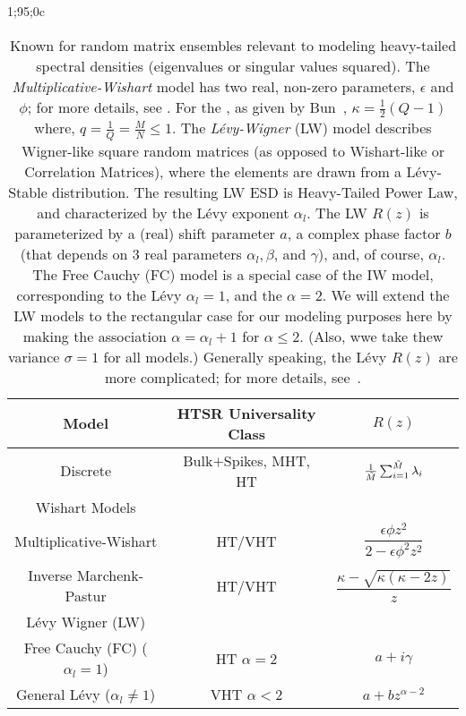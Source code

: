 1;95;0c%
\begin{table}[h!]
  \centering
  \renewcommand{\arraystretch}{1.25} %
\begin{tabular}{|c|c|c|}
  \hline
  Model & \textbf{HTSR Universality Class} & \textbf{$R(z)$}\\  \hline
  \hline
  Discrete & Bulk$+$Spikes, MHT, HT & $\tfrac{1}{\tilde{M}}\sum_{i=1}^{\tilde{M}}\lambda_{i}$   \\ \hline
  \hline
  Wishart Models & &\\ \hline
  Multiplicative-Wishart & HT/VHT& $\dfrac{\epsilon\phi z^2}{2 - \epsilon\phi^2 z^2}$ \\  \hline
  Inverse Marchenk-Pastur & HT/VHT &  $\dfrac{\kappa-\sqrt{\kappa(\kappa-2z)}}{z}$   \\  \hline
  \hline
  L\'evy Wigner (LW) &   & \\  \hline
  Free Cauchy (FC) ($\alpha_{l}=1$) & HT $\alpha=2$ & $a+i\gamma$ \\ \hline
  General L\'evy  ($\alpha_{l}\ne 1$) & VHT $\alpha<2$   & $a+bz^{\alpha-2}$ \\  \hline
\end{tabular}
  \caption{Known \RTransforms for random matrix ensembles relevant to modeling heavy-tailed spectral densities (eigenvalues or singular values squared).
    The \emph{Multiplicative-Wishart} model has two real, non-zero parameters, $\epsilon$ and $\phi$; for more details, see \cite{Pennington2017}.
  For the \emph{\InverseMP}, as given by Bun~\cite{BunThesis}, $\kappa=\frac{1}{2}(Q-1)$ where, $q=\frac{1}{Q}=\frac{M}{N}\le 1$.
  The \emph{L\'evy-Wigner} (LW) model describes Wigner-like square random matrices
  (as opposed to Wishart-like or Correlation Matrices), where the elements are drawn from a L\'evy-Stable distribution.
  The resulting LW ESD is Heavy-Tailed Power Law, and characterized by the L\'evy exponent $\alpha_{l}$.
  The LW $R(z)$ is parameterized by a (real) shift parameter $a$,
  a complex phase factor $b$ (that depends on 3 real parameters   $\alpha_{l}, \beta$, and $\gamma$),
  and, of course, $\alpha_{l}$.
  The Free Cauchy (FC) model is a special case of the IW model, corresponding to the L\'evy $\alpha_{l}=1$, and the \HTSR $\alpha=2$. 
  We will extend the LW models to the rectangular case for our modeling purposes here by making
  the association   $\alpha = \alpha_{l}+1$ for $\alpha\le 2$.
   (Also, wwe take thew variance $\sigma=1$ for all models.)
   Generally speaking, the L\'evy $R(z)$ are more complicated; 
   for more details, see~\cite{BJNx01_TR,BJNx06_TR,BJ09_TR}.
}
\label{tab:known_r_transforms}
\end{table}

